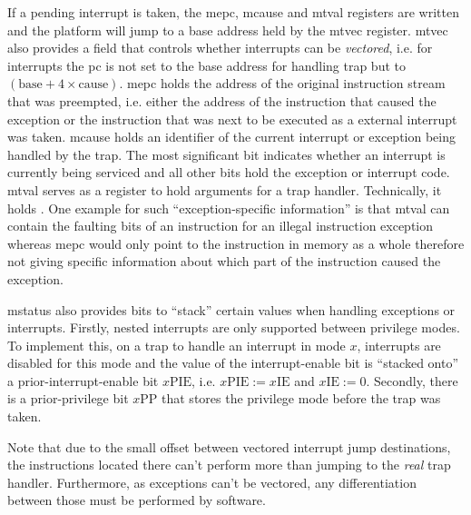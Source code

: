 If a pending interrupt is taken, the \gls{mepc}, \gls{mcause} and \gls{mtval} registers are written and the platform will jump to a base address held by the \gls{mtvec} register.
\gls{mtvec} also provides a field that controls whether interrupts can be \textit{vectored}, i.e. for interrupts the \gls{pc} is not set to the base address for handling trap but to $ (\text{base} + 4 \times \text{cause}) $.
\gls{mepc} holds the address of the original instruction stream that was preempted, i.e. either the address of the instruction that caused the exception or the instruction that was next to be executed as a external interrupt was taken.
\gls{mcause} holds an identifier of the current interrupt or exception being handled by the trap.
The most significant bit indicates whether an interrupt is currently being serviced and all other bits hold the exception or interrupt code.
\gls{mtval} serves as a register to hold arguments for a trap handler.
Technically, it holds .
One example for such \enquote{exception-specific information} is that \gls{mtval} can contain the faulting bits of an instruction for an illegal instruction exception whereas \gls{mepc} would only point to the instruction in memory as a whole therefore not giving specific information about which part of the instruction caused the exception.

\gls{mstatus} also provides bits to \enquote{stack} certain values when handling exceptions or interrupts.
Firstly, nested interrupts are only supported between privilege modes.
To implement this, on a trap to handle an interrupt in mode $ x $, interrupts are disabled for this mode and the value of the interrupt-enable bit is \enquote{stacked onto} a prior-interrupt-enable bit $x\text{PIE} $, i.e. $ x\text{PIE} := x\text{IE} $ and $ x\text{IE} := 0 $.
Secondly, there is a prior-privilege bit $ x\text{PP} $ that stores the privilege mode before the trap was taken.

Note that due to the small offset between vectored interrupt jump destinations, the instructions located there can't perform more than jumping to the \textit{real} trap handler.
Furthermore, as exceptions can't be vectored, any differentiation between those must be performed by software.

